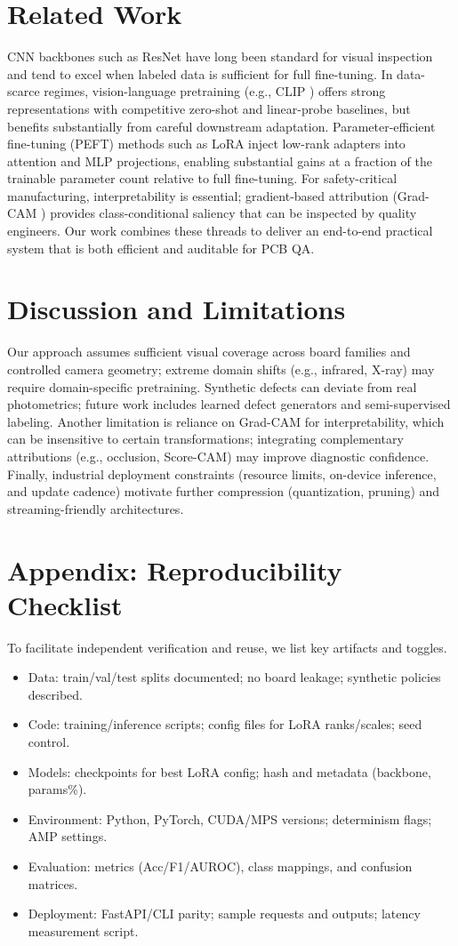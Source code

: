 \documentclass[conference]{IEEEtran}
\begin{document}
\section{Related Work}
CNN backbones such as ResNet \cite{resnet} have long been standard for visual inspection and tend to excel when labeled data is sufficient for full fine-tuning. In data-scarce regimes, vision-language pretraining (e.g., CLIP \cite{clip}) offers strong representations with competitive zero-shot and linear-probe baselines, but benefits substantially from careful downstream adaptation. Parameter-efficient fine-tuning (PEFT) methods such as LoRA \cite{lora} inject low-rank adapters into attention and MLP projections, enabling substantial gains at a fraction of the trainable parameter count relative to full fine-tuning. For safety-critical manufacturing, interpretability is essential; gradient-based attribution (Grad-CAM \cite{gradcam}) provides class-conditional saliency that can be inspected by quality engineers. Our work combines these threads to deliver an end-to-end practical system that is both efficient and auditable for PCB QA.

\section{Discussion and Limitations}
Our approach assumes sufficient visual coverage across board families and controlled camera geometry; extreme domain shifts (e.g., infrared, X-ray) may require domain-specific pretraining. Synthetic defects can deviate from real photometrics; future work includes learned defect generators and semi-supervised labeling. Another limitation is reliance on Grad-CAM for interpretability, which can be insensitive to certain transformations; integrating complementary attributions (e.g., occlusion, Score-CAM) may improve diagnostic confidence. Finally, industrial deployment constraints (resource limits, on-device inference, and update cadence) motivate further compression (quantization, pruning) and streaming-friendly architectures.

\section{Appendix: Reproducibility Checklist}
To facilitate independent verification and reuse, we list key artifacts and toggles.
\begin{itemize}
  \item Data: train/val/test splits documented; no board leakage; synthetic policies described.
  \item Code: training/inference scripts; config files for LoRA ranks/scales; seed control.
  \item Models: checkpoints for best LoRA config; hash and metadata (backbone, params\%).
  \item Environment: Python, PyTorch, CUDA/MPS versions; determinism flags; AMP settings.
  \item Evaluation: metrics (Acc/F1/AUROC), class mappings, and confusion matrices.
  \item Deployment: FastAPI/CLI parity; sample requests and outputs; latency measurement script.
\end{itemize}
\end{document}
